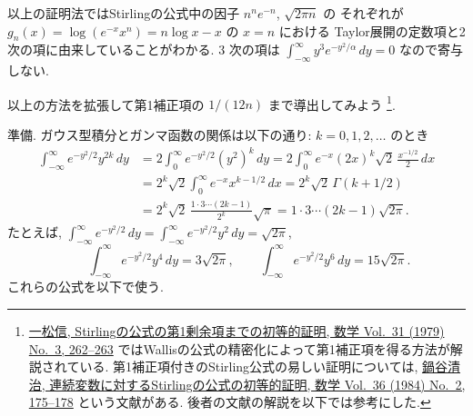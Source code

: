 \documentclass[12pt,twoside]{jarticle}
\theoremstyle{jplain}
\theoremstyle{jplain}
\theoremstyle{jplain}
\numberwithin{theorem}{section}
\numberwithin{equation}{section}
\numberwithin{figure}{section}
\numberwithin{table}{section}
\begin{document}
以上の証明法ではStirlingの公式中の因子 $n^n e^{-n}$, $\sqrt{2\pi n}$ の
それぞれが $g_n(x)=\log(e^{-x}x^n)=n\log x-x$ の $x=n$ における
Taylor展開の定数項と2次の項に由来していることがわかる.
$3$ 次の項は $\int_{-\infty}^\infty y^3 e^{-y^2/\alpha}\,dy=0$
なので寄与しない.

以上の方法を拡張して第1補正項の $1/(12n)$ まで導出してみよう%
\footnote{%
\href{https://www.jstage.jst.go.jp/article/sugaku1947/31/3/31_3_262/_article/references/-char/ja/}
{一松信, Stirlingの公式の第1剰余項までの初等的証明,
数学 Vol.~31 (1979) No.~3, 262--263}
ではWallisの公式の精密化によって第1補正項を得る方法が解説されている.
第1補正項付きのStirling公式の易しい証明については,
\href{https://www.jstage.jst.go.jp/article/sugaku1947/36/2/36_2_175/_article/references/-char/ja/}
{鍋谷清治, 連続変数に対するStirlingの公式の初等的証明,
数学 Vol.~36 (1984) No.~2, 175--178}
という文献がある. 後者の文献の解説を以下では参考にした.}.

準備. ガウス型積分とガンマ函数の関係は以下の通り: $k=0,1,2,\ldots$ のとき
\begin{align*}
\int_{-\infty}^\infty e^{-y^2/2}y^{2k}\,dy
&=2\int_0^\infty e^{-y^2/2} (y^2)^k \,dy
=2\int_0^\infty e^{-x} (2x)^k \sqrt{2}\,\frac{x^{-1/2}}{2}\,dx
\\ &
=2^k\sqrt{2}\int_0^\infty e^{-x} x^{k-1/2}\,dx
=2^k\sqrt{2}\,\Gamma(k+1/2)
\\ &
=2^k\sqrt{2}\,\frac{1\cdot3\cdots(2k-1)}{2^k}\sqrt{\pi}
=1\cdot3\cdots(2k-1)\sqrt{2\pi}.
\end{align*}
たとえば,
\(
\int_{-\infty}^\infty e^{-y^2/2}\,dy
=\int_{-\infty}^\infty e^{-y^2/2}y^2\,dy
=\sqrt{2\pi}
\),
\[
\qquad
\int_{-\infty}^\infty e^{-y^2/2}y^4\,dy = 3\sqrt{2\pi}, \qquad
\int_{-\infty}^\infty e^{-y^2/2}y^6\,dy = 15\sqrt{2\pi}.
\]
これらの公式を以下で使う.
\end{document}
